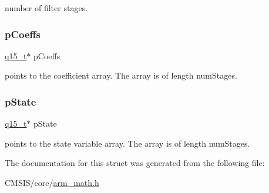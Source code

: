 number of filter stages. \mbox{\label{structarm__fir__lattice__instance__q15_a7ca181a37f714d174445f486bebce26f}} 
\subsubsection{\texorpdfstring{pCoeffs}{pCoeffs}}
{\footnotesize\ttfamily \mbox{\hyperlink{arm__math_8h_ab5a8fb21a5b3b983d5f54f31614052ea}{q15\+\_\+t}}$\ast$ p\+Coeffs}

points to the coefficient array. The array is of length num\+Stages. \mbox{\label{structarm__fir__lattice__instance__q15_ae29dfdb736374fcddaeaec4b7770170c}} 
\subsubsection{\texorpdfstring{pState}{pState}}
{\footnotesize\ttfamily \mbox{\hyperlink{arm__math_8h_ab5a8fb21a5b3b983d5f54f31614052ea}{q15\+\_\+t}}$\ast$ p\+State}

points to the state variable array. The array is of length num\+Stages. 

The documentation for this struct was generated from the following file\+:\begin{DoxyCompactItemize}
\item 
C\+M\+S\+I\+S/core/\mbox{\hyperlink{arm__math_8h}{arm\+\_\+math.\+h}}\end{DoxyCompactItemize}
